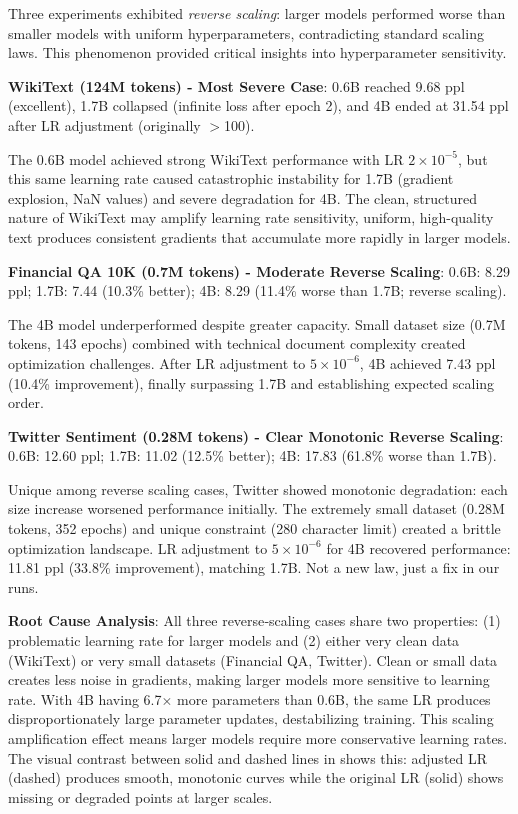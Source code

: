 Three experiments exhibited \textit{reverse scaling}: larger models performed worse than smaller models with uniform hyperparameters, contradicting standard scaling laws. This phenomenon provided critical insights into hyperparameter sensitivity.

\textbf{WikiText (124M tokens) - Most Severe Case}: 0.6B reached 9.68 ppl (excellent), 1.7B collapsed (infinite loss after epoch 2), and 4B ended at 31.54 ppl after LR adjustment (originally $>$100).

The 0.6B model achieved strong WikiText performance with LR $2\times10^{-5}$, but this same learning rate caused catastrophic instability for 1.7B (gradient explosion, NaN values) and severe degradation for 4B. The clean, structured nature of WikiText may amplify learning rate sensitivity, uniform, high-quality text produces consistent gradients that accumulate more rapidly in larger models.

\textbf{Financial QA 10K (0.7M tokens) - Moderate Reverse Scaling}: 0.6B: 8.29 ppl; 1.7B: 7.44 (10.3\% better); 4B: 8.29 (11.4\% worse than 1.7B; reverse scaling).

The 4B model underperformed despite greater capacity. Small dataset size (0.7M tokens, 143 epochs) combined with technical document complexity created optimization challenges. After LR adjustment to $5\times10^{-6}$, 4B achieved 7.43 ppl (10.4\% improvement), finally surpassing 1.7B and establishing expected scaling order.

\textbf{Twitter Sentiment (0.28M tokens) - Clear Monotonic Reverse Scaling}: 0.6B: 12.60 ppl; 1.7B: 11.02 (12.5\% better); 4B: 17.83 (61.8\% worse than 1.7B).

Unique among reverse scaling cases, Twitter showed monotonic degradation: each size increase worsened performance initially. The extremely small dataset (0.28M tokens, 352 epochs) and unique constraint (280 character limit) created a brittle optimization landscape. LR adjustment to $5\times10^{-6}$ for 4B recovered performance: 11.81 ppl (33.8\% improvement), matching 1.7B. Not a new law, just a fix in our runs.

\textbf{Root Cause Analysis}: All three reverse‑scaling cases share two properties: (1) problematic learning rate for larger models and (2) either very clean data (WikiText) or very small datasets (Financial QA, Twitter). Clean or small data creates less noise in gradients, making larger models more sensitive to learning rate. With 4B having 6.7$\times$ more parameters than 0.6B, the same LR produces disproportionately large parameter updates, destabilizing training. This scaling amplification effect means larger models require more conservative learning rates. The visual contrast between solid and dashed lines in  shows this: adjusted LR (dashed) produces smooth, monotonic curves while the original LR (solid) shows missing or degraded points at larger scales.

